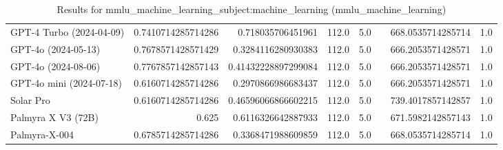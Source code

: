 \begin{table}[htp]
{\begin{tabular}{lrrrrrrr}
GPT-4 Turbo (2024-04-09) & 0.7410714285714286 & 0.718035706451961 & 112.0 & 5.0 &  & 668.0535714285714 & 1.0 \\
GPT-4o (2024-05-13) & 0.7678571428571429 & 0.3284116280930383 & 112.0 & 5.0 &  & 666.2053571428571 & 1.0 \\
GPT-4o (2024-08-06) & 0.7767857142857143 & 0.41432228897299084 & 112.0 & 5.0 &  & 666.2053571428571 & 1.0 \\
GPT-4o mini (2024-07-18) & 0.6160714285714286 & 0.2970866986683437 & 112.0 & 5.0 &  & 666.2053571428571 & 1.0 \\
Solar Pro & 0.6160714285714286 & 0.46596066866602215 & 112.0 & 5.0 &  & 739.4017857142857 & 1.0 \\
Palmyra X V3 (72B) & 0.625 & 0.6116326642887933 & 112.0 & 5.0 &  & 671.5982142857143 & 1.0 \\
Palmyra-X-004 & 0.6785714285714286 & 0.3368471988609859 & 112.0 & 5.0 &  & 668.0535714285714 & 1.0 \\
\bottomrule
\end{tabular}}
\caption{Results for mmlu_machine_learning_subject:machine_learning (mmlu_machine_learning)}
\label{fig:mmlu_machine_learning_subject:machine_learning (mmlu_machine_learning)}
\end{table}